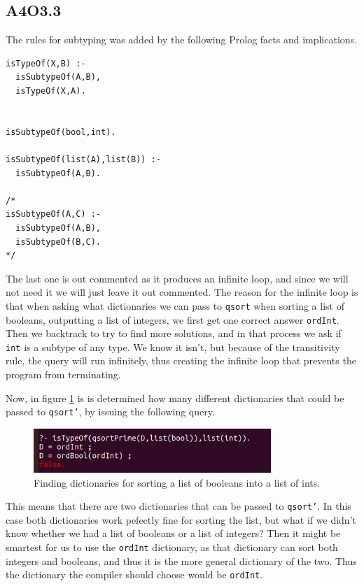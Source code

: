 \newpage
\subsection*{A4O3.3}
The rules for subtyping was added by the following Prolog facts and implications.

\begin{verbatim}
isTypeOf(X,B) :-
  isSubtypeOf(A,B),
  isTypeOf(X,A).


isSubtypeOf(bool,int).

isSubtypeOf(list(A),list(B)) :-
  isSubtypeOf(A,B).

/*
isSubtypeOf(A,C) :-
  isSubtypeOf(A,B),
  isSubtypeOf(B,C).
*/
\end{verbatim}
The last one is out commented as it produces an infinite loop, and since we will not need it we will just leave it out commented. The reason for the infinite loop is that when asking what dictionaries we can pass to \texttt{qsort} when sorting a list of booleans, outputting a list of integers, we first get one correct answer \texttt{ordInt}. Then we backtrack to try to find more solutions, and in that process we ask if \texttt{int} is a subtype of any type. We know it isn't, but because of the transitivity rule, the query will run infinitely, thus creating the infinite loop that prevents the program from terminating.

Now, in figure \ref{fig:boollist} is is determined how many different dictionaries that could be passed to \texttt{qsort'}, by issuing the following query.

\begin{figure}[h]
\centering
\includegraphics[width=0.8\textwidth]{O33.png}
\caption{Finding dictionaries for sorting a list of booleans into a list of ints.}
\label{fig:boollist}
\end{figure}

This means that there are two dictionaries that can be passed to \texttt{qsort'}. In this case both dictionaries work pefectly fine for sorting the list, but what if we didn't know whether we had a list of booleans or a list of integers? Then it might be smartest for us to use the \texttt{ordInt} dictionary, as that dictionary can sort both integers and booleans, and thus it is the more general dictionary of the two. Thus the dictionary the compiler should choose would be \texttt{ordInt}.
